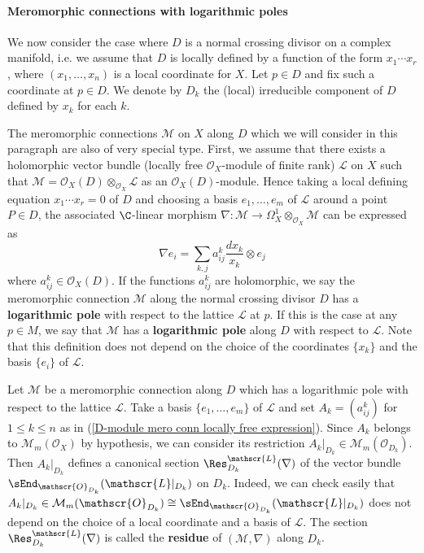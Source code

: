\paragraph{Meromorphic connections with logarithmic poles}
We now consider the case where $D$ is a normal crossing divisor on a complex manifold, i.e. we assume that $D$ is locally defined by a function of the form $x_1\cdots x_r$, where $(x_1,\dots,x_n)$ is a local coordinate for $X$. Let $p\in D$ and fix such a coordinate at $p\in D$. We denote by $D_k$ the (local) irreducible component of $D$ defined by $x_k$ for each $k$.\par
The meromorphic connections $\mathscr{M}$ on $X$ along $D$ which we will consider in this paragraph are also of very special type. First, we assume that there exists a holomorphic vector bundle (locally free $\mathscr{O}_X$-module of finite rank) $\mathscr{L}$ on $X$ such that $\mathscr{M}=\mathscr{O}_X(D)\otimes_{\mathscr{O}_X}\mathscr{L}$ as an $\mathscr{O}_X(D)$-module. Hence taking a local defining equation $x_1\cdots x_r=0$ of $D$ and choosing a basis $e_1,\dots,e_m$ of $\mathscr{L}$ around a point $P\in D$, the associated $\C$-linear morphism $\nabla:\mathscr{M}\to\Omega_X^1\otimes_{\mathscr{O}_X}\mathscr{M}$ can be expressed as
\begin{equation}\label{D-module mero conn locally free expression}
\nabla e_i=\sum_{k,j}a_{ij}^k\frac{dx_k}{x_k}\otimes e_j
\end{equation}
where $a_{ij}^k\in\mathscr{O}_X(D)$. If the functions $a_{ij}^k$ are holomorphic, we say the meromorphic connection $\mathscr{M}$ along the normal crossing divisor $D$ has a \textbf{logarithmic pole} with respect to the lattice $\mathscr{L}$ at $p$. If this is the case at any $p\in M$, we say that $\mathscr{M}$ has a \textbf{logarithmic pole} along $D$ with respect to $\mathscr{L}$. Note that this definition does not depend on the choice of the coordinates $\{x_k\}$ and the basis $\{e_i\}$ of $\mathscr{L}$.\par
Let $\mathscr{M}$ be a meromorphic connection along $D$ which has a logarithmic pole with respect to the lattice $\mathscr{L}$. Take a basis $\{e_1,\dots,e_m\}$ of $\mathscr{L}$ and set $A_k=(a_{ij}^k)$ for $1\leq k\leq n$ as in (\ref{D-module mero conn locally free expression}). Since $A_k$ belongs to $\mathcal{M}_m(\mathscr{O}_X)$ by hypothesis, we can consider its restriction $A_k|_{D_k}\in\mathcal{M}_{m}(\mathscr{O}_{D_k})$. Then $A_k|_{D_k}$ defines a canonical section $\Res^{\mathscr{L}}_{D_k}(\nabla)$ of the vector bundle $\sEnd_{\mathscr{O}_{D_k}}(\mathscr{L}|_{D_k})$ on $D_k$. Indeed, we can check easily that $A_k|_{D_k}\in\mathcal{M}_{m}(\mathscr{O}_{D_k})\cong\sEnd_{\mathscr{O}_{D_k}}(\mathscr{L}|_{D_k})$ does not depend on the choice of a local coordinate and a basis of $\mathscr{L}$. The section $\Res^{\mathscr{L}}_{D_k}(\nabla)$ is called the \textbf{residue} of $(\mathscr{M},\nabla)$ along $D_k$.

